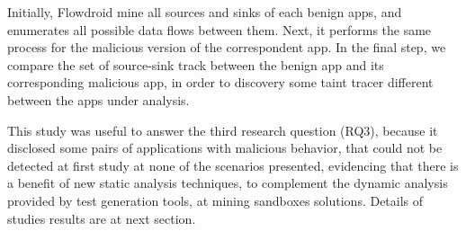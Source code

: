 Initially, Flowdroid mine all sources and sinks of each benign apps, and enumerates all possible data flows between them. Next, it performs the same process for the malicious version
of the correspondent app. In the final step, we compare the set of source-sink track between the benign app and its corresponding malicious app, in order to discovery some taint tracer different between the apps under analysis.

This study was useful to answer the third research question (RQ3), because it disclosed some pairs of applications with malicious behavior, that could not be detected at first study at none of the scenarios presented, evidencing that there is a benefit of new static analysis techniques, to complement the dynamic analysis provided by test generation tools, at mining sandboxes solutions. Details of studies results are at next section.





